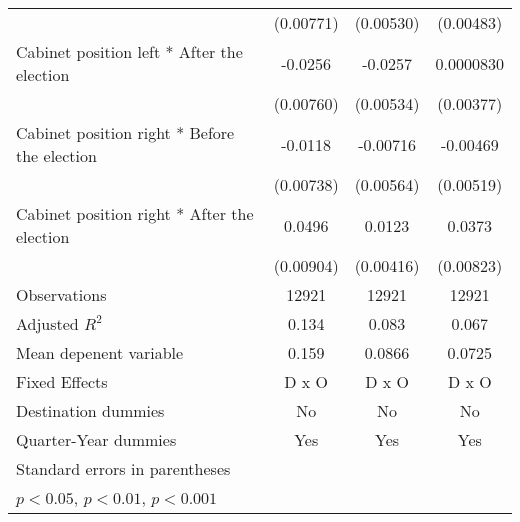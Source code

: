 \begin{table}[htbp]
\begin{tabular}{l*{3}{c}}
                    &   (0.00771)         &   (0.00530)         &   (0.00483)         \\
[1em]
Cabinet position left * After the election&     -0.0256\sym{**} &     -0.0257\sym{***}&   0.0000830         \\
                    &   (0.00760)         &   (0.00534)         &   (0.00377)         \\
[1em]
Cabinet position right * Before the election&     -0.0118         &    -0.00716         &    -0.00469         \\
                    &   (0.00738)         &   (0.00564)         &   (0.00519)         \\
[1em]
Cabinet position right * After the election&      0.0496\sym{***}&      0.0123\sym{**} &      0.0373\sym{***}\\
                    &   (0.00904)         &   (0.00416)         &   (0.00823)         \\
\hline
Observations        &       12921         &       12921         &       12921         \\
Adjusted \(R^{2}\)  &       0.134         &       0.083         &       0.067         \\
Mean depenent variable&       0.159         &      0.0866         &      0.0725         \\
Fixed Effects       &       D x O         &       D x O         &       D x O         \\
Destination dummies &          No         &          No         &          No         \\
Quarter-Year dummies&         Yes         &         Yes         &         Yes         \\
\hline\hline
\multicolumn{4}{l}{\footnotesize Standard errors in parentheses}\\
\multicolumn{4}{l}{\footnotesize \sym{*} \(p<0.05\), \sym{**} \(p<0.01\), \sym{***} \(p<0.001\)}\\
\end{tabular}
\end{table}
